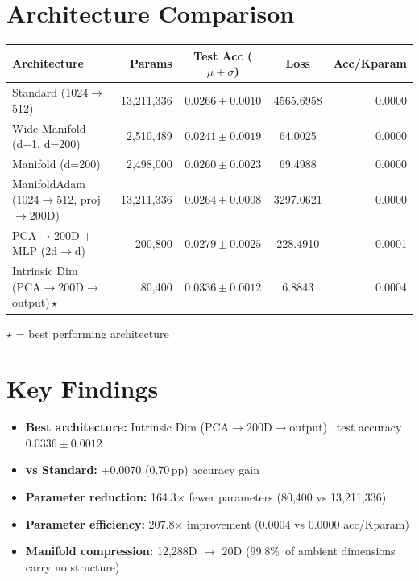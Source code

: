 \documentclass[11pt,letterpaper]{article}
\begin{document}
\section{Architecture Comparison}

{\small
\begin{tabular}{@{}p{7cm}rccr@{}}
\toprule
\textbf{Architecture} & \textbf{Params} & \textbf{Test Acc ($\mu \pm \sigma$)} & \textbf{Loss} & \textbf{Acc/Kparam} \\
\midrule
  {Standard (1024$\rightarrow$512)} & 13,211,336 & $0.0266 \pm 0.0010$ & 4565.6958 & 0.0000 \\
  {Wide Manifold (d+1, d=200)} & 2,510,489 & $0.0241 \pm 0.0019$ & 64.0025 & 0.0000 \\
  {Manifold (d=200)} & 2,498,000 & $0.0260 \pm 0.0023$ & 69.4988 & 0.0000 \\
  {ManifoldAdam (1024$\rightarrow$512, proj$\rightarrow$200D)} & 13,211,336 & $0.0264 \pm 0.0008$ & 3297.0621 & 0.0000 \\
  {PCA$\rightarrow$200D + MLP (2d$\rightarrow$d)} & 200,800 & $0.0279 \pm 0.0025$ & 228.4910 & 0.0001 \\
  {\color{wincolor}Intrinsic Dim (PCA$\rightarrow$200D$\rightarrow$output)\,$\star$} & 80,400 & $0.0336 \pm 0.0012$ & 6.8843 & 0.0004 \\
\bottomrule
\end{tabular}
}

\smallskip
{\small $\star$ = best performing architecture}

\section{Key Findings}

\begin{itemize}[leftmargin=*,itemsep=3pt]
  \item \textbf{Best architecture:} Intrinsic Dim (PCA$\rightarrow$200D$\rightarrow$output) \textemdash\ test accuracy $0.0336 \pm 0.0012$
  \item \textbf{vs Standard:} $+0.0070$ (0.70\,pp) accuracy gain
  \item \textbf{Parameter reduction:} 164.3$\times$ fewer parameters (80,400 vs 13,211,336)
  \item \textbf{Parameter efficiency:} 207.8$\times$ improvement (0.0004 vs 0.0000 acc/Kparam)
  \item \textbf{Manifold compression:} 12,288D $\rightarrow$ 20D (99.8\%\ of ambient dimensions carry no structure)
\end{itemize}
\end{document}

